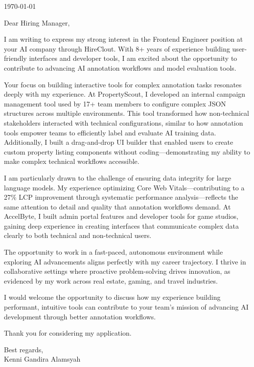 \documentclass[a4paper, 11pt]{article}
\newcommand{\link}[2]{{\color[HTML]{096dd9}\href[pdfnewwindow=true]{#1}{#2}}}
\begin{document}

\vspace{20pt}

\today

\vspace{20pt}

Dear Hiring Manager,

I am writing to express my strong interest in the Frontend Engineer position at your AI company through HireClout. With 8+ years of experience building user-friendly interfaces and developer tools, I am excited about the opportunity to contribute to advancing AI annotation workflows and model evaluation tools.

Your focus on building interactive tools for complex annotation tasks resonates deeply with my experience. At PropertyScout, I developed an internal campaign management tool used by 17+ team members to configure complex JSON structures across multiple environments. This tool transformed how non-technical stakeholders interacted with technical configurations, similar to how annotation tools empower teams to efficiently label and evaluate AI training data. Additionally, I built a drag-and-drop UI builder that enabled users to create custom property listing components without coding---demonstrating my ability to make complex technical workflows accessible.

I am particularly drawn to the challenge of ensuring data integrity for large language models. My experience optimizing Core Web Vitals---contributing to a 27\% LCP improvement through systematic performance analysis---reflects the same attention to detail and quality that annotation workflows demand. At AccelByte, I built admin portal features and developer tools for game studios, gaining deep experience in creating interfaces that communicate complex data clearly to both technical and non-technical users.

The opportunity to work in a fast-paced, autonomous environment while exploring AI advancements aligns perfectly with my career trajectory. I thrive in collaborative settings where proactive problem-solving drives innovation, as evidenced by my work across real estate, gaming, and travel industries.

I would welcome the opportunity to discuss how my experience building performant, intuitive tools can contribute to your team's mission of advancing AI development through better annotation workflows.

Thank you for considering my application.

\vspace{10pt}

Best regards, \\
Kenni Gandira Alamsyah
\end{document}

